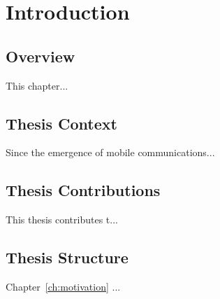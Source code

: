 \chapter{Introduction}
\label{ch:introduction}

\section{Overview}
This chapter...

\section{Thesis Context}

Since the emergence of mobile communications...

\section{Thesis Contributions}
This thesis contributes t...

\section{Thesis Structure}
Chapter~\ref{ch:motivation} ...

